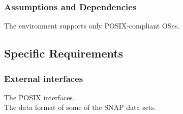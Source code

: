 	\subsubsection{Assumptions and Dependencies}
		The environment supports only POSIX-compliant OSes.


\subsection{Specific Requirements}

	\subsubsection{External interfaces}
	The POSIX interfaces. \\
	The data format of some of the SNAP data sets. \\

